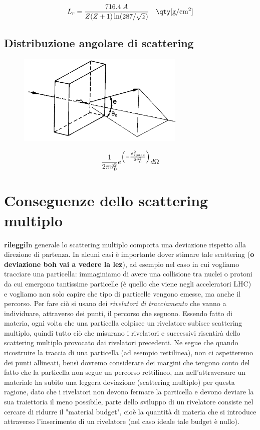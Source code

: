 $$L_r=\frac{716.4 \; A}{Z(Z+1)\ln(287/\sqrt{z})}
\quad \rm \qty[g/cm^2]$$

\subsection{Distribuzione angolare di scattering}

\begin{figure}[H]
    \centering
    \includegraphics[width=8cm]{immagini/distribuzione_angolare_di_scattering.png}
\end{figure}

$$\frac{1}{2 \pi \vartheta_0^2}e^{\left(-\frac{\vartheta_{\rm space}^2}{2\vartheta_0^2}\right)}d \Omega$$

\section{Conseguenze dello scattering multiplo}

\textbf{rileggi}In generale lo scattering multiplo comporta una deviazione rispetto alla direzione di partenza. In alcuni casi è importante dover stimare tale scattering (\textbf{o deviazione boh vai a vedere la lez}), ad esempio nel caso in cui vogliamo tracciare una particella: immaginiamo di avere una collisione tra nuclei o protoni da cui emergono tantissime particelle (è quello che viene negli acceleratori LHC) e vogliamo non solo capire che tipo di particelle vengono emesse, ma anche il percorso. Per fare ciò si usano dei \textit{rivelatori di tracciamento} che vanno a individuare, attraverso dei punti, il percorso che seguono. Essendo fatto di materia, ogni volta che una particella colpisce un rivelatore subisce scattering multiplo, quindi tutto ciò che misurano i rivelatori e successivi risentirà dello scattering multiplo provocato dai rivelatori precedenti. Ne segue che quando ricostruire la traccia di una particella (ad esempio rettilinea), non ci aspetteremo dei punti allineati, bensì dovremo considerare dei margini che tengono conto del fatto che la particella non segue un percorso rettilineo, ma nell'attraversare un materiale ha subito una leggera deviazione (scattering multiplo) per questa ragione, dato che i rivelatori non devono fermare la particella e devono deviare la sua traiettoria il meno possibile, parte dello sviluppo di un rivelatore consiste nel cercare di ridurre il "material budget", cioè la quantità di materia che si introduce attraverso l'inserimento di un rivelatore (nel caso ideale tale budget è nullo).

